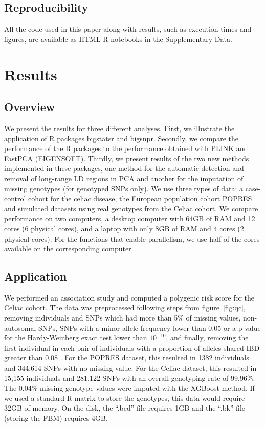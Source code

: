 \documentclass{bioinfo}
\begin{document}
\begin{methods}
\subsection{Reproducibility}

All the code used in this paper along with results, such as execution times and figures, are available as HTML R notebooks in the Supplementary Data.

\end{methods}

\section{Results}

\subsection{Overview}\label{sec:overview}

We present the results for three different analyses. First, we illustrate the application of R packages bigstatsr and bigsnpr. Secondly, we compare the performance of the R packages to the performance obtained with PLINK and FastPCA (EIGENSOFT). Thirdly, we present results of the two new methods implemented in these packages, one method for the automatic detection and removal of long-range LD regions in PCA and another for the imputation of missing genotypes {\color{red} (for genotyped SNPs only)}. We use three types of data: a case-control cohort for the celiac disease, the European population cohort POPRES and simulated datasets using real genotypes from the Celiac cohort. We compare performance on two computers, a desktop computer with 64GB of RAM and 12 cores (6 physical cores), and a laptop with only 8GB of RAM and 4 cores (2 physical cores). For the functions that enable parallelism, we use half of the cores available on the corresponding computer.

\subsection{Application}
 
We performed an association study and computed a polygenic risk score for the Celiac cohort. 
The data was preprocessed following steps from figure~\ref{fig:qc}, removing individuals and SNPs which had more than 5\% of missing values, non-autosomal SNPs, SNPs with a minor allele frequency lower than 0.05 or a p-value for the Hardy-Weinberg exact test lower than $10^{-10}$, and finally, removing the first individual in each pair of individuals with a proportion of alleles shared IBD greater than 0.08 \cite[]{Purcell2007}. 
For the POPRES dataset, this resulted in 1382 individuals and 344,614 SNPs with no missing value.
For the Celiac dataset, this resulted in 15,155 individuals and 281,122 SNPs with an overall genotyping rate of 99.96\%. The 0.04\% missing genotype values were imputed with the XGBoost method. If we used a standard R matrix to store the genotypes, this data would require 32GB of memory. On the disk, the ``.bed'' file requires 1GB and the ``.bk'' file (storing the FBM) requires 4GB. 
\end{document}
